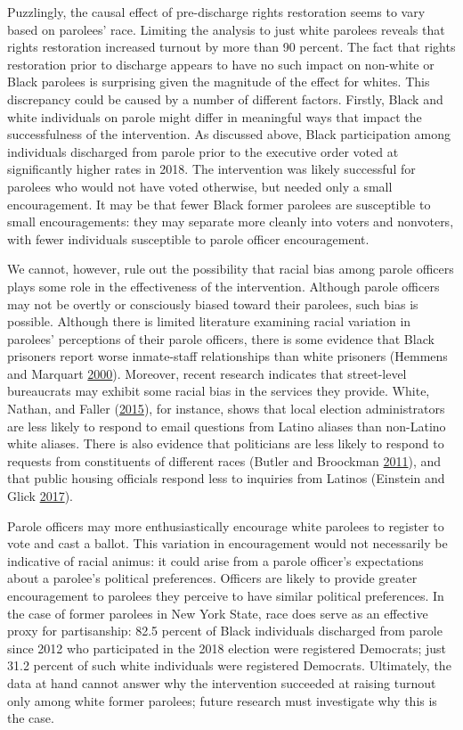 \documentclass[
  12pt,
]{article}
\begin{document}
Puzzlingly, the causal effect of pre-discharge rights restoration seems to vary based on parolees' race. Limiting the analysis to just white parolees reveals that rights restoration increased turnout by more than 90 percent. The fact that rights restoration prior to discharge appears to have no such impact on non-white or Black parolees is surprising given the magnitude of the effect for whites. This discrepancy could be caused by a number of different factors. Firstly, Black and white individuals on parole might differ in meaningful ways that impact the successfulness of the intervention. As discussed above, Black participation among individuals discharged from parole prior to the executive order voted at significantly higher rates in 2018. The intervention was likely successful for parolees who would not have voted otherwise, but needed only a small encouragement. It may be that fewer Black former parolees are susceptible to small encouragements: they may separate more cleanly into voters and nonvoters, with fewer individuals susceptible to parole officer encouragement.

We cannot, however, rule out the possibility that racial bias among parole officers plays some role in the effectiveness of the intervention. Although parole officers may not be overtly or consciously biased toward their parolees, such bias is possible. Although there is limited literature examining racial variation in parolees' perceptions of their parole officers, there is some evidence that Black prisoners report worse inmate-staff relationships than white prisoners (Hemmens and Marquart \protect\hyperlink{ref-Hemmens2000}{2000}). Moreover, recent research indicates that street-level bureaucrats may exhibit some racial bias in the services they provide. White, Nathan, and Faller (\protect\hyperlink{ref-White2015}{2015}), for instance, shows that local election administrators are less likely to respond to email questions from Latino aliases than non-Latino white aliases. There is also evidence that politicians are less likely to respond to requests from constituents of different races (Butler and Broockman \protect\hyperlink{ref-Butler2011}{2011}), and that public housing officials respond less to inquiries from Latinos (Einstein and Glick \protect\hyperlink{ref-Einstein2017}{2017}).

Parole officers may more enthusiastically encourage white parolees to register to vote and cast a ballot. This variation in encouragement would not necessarily be indicative of racial animus: it could arise from a parole officer's expectations about a parolee's political preferences. Officers are likely to provide greater encouragement to parolees they perceive to have similar political preferences. In the case of former parolees in New York State, race does serve as an effective proxy for partisanship: 82.5 percent of Black individuals discharged from parole since 2012 who participated in the 2018 election were registered Democrats; just 31.2 percent of such white individuals were registered Democrats. Ultimately, the data at hand cannot answer why the intervention succeeded at raising turnout only among white former parolees; future research must investigate why this is the case.
\end{document}
